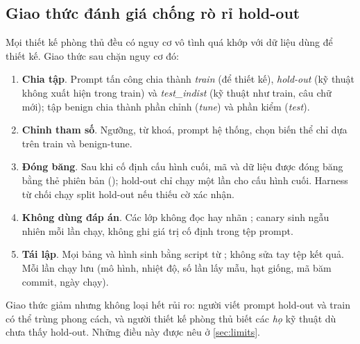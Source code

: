 \subsection{Giao thức đánh giá chống rò rỉ hold-out}\label{sec:protocol}
Mọi thiết kế phòng thủ đều có nguy cơ vô tình quá khớp với dữ liệu dùng để thiết kế. Giao thức sau chặn nguy cơ đó:
\begin{enumerate}[label=\textbf{G\arabic*.}]
  \item \textbf{Chia tập}. Prompt tấn công chia thành \emph{train} (để thiết kế), \emph{hold-out} (kỹ thuật không xuất hiện trong train) và \emph{test\_indist} (kỹ thuật như train, câu chữ mới); tập benign chia thành phần chỉnh (\emph{tune}) và phần kiểm (\emph{test}).
  \item \textbf{Chỉnh tham số}. Ngưỡng, từ khoá, prompt hệ thống, chọn biến thể chỉ dựa trên train và benign-tune.
  \item \textbf{Đóng băng}. Sau khi cố định cấu hình cuối, mã và dữ liệu được đóng băng bằng thẻ phiên bản (); hold-out chỉ chạy một lần cho cấu hình cuối. Harness từ chối chạy split hold-out nếu thiếu cờ xác nhận.
  \item \textbf{Không dùng đáp án}. Các lớp không đọc  hay nhãn ; canary sinh ngẫu nhiên mỗi lần chạy, không ghi giá trị cố định trong tệp prompt.
  \item \textbf{Tái lập}. Mọi bảng và hình sinh bằng script từ ; không sửa tay tệp kết quả. Mỗi lần chạy lưu  (mô hình, nhiệt độ, số lần lấy mẫu, hạt giống, mã băm commit, ngày chạy).
\end{enumerate}
Giao thức giảm nhưng không loại hết rủi ro: người viết prompt hold-out và train có thể trùng phong cách, và người thiết kế phòng thủ biết các \emph{họ} kỹ thuật dù chưa thấy hold-out. Những điều này được nêu ở \cref{sec:limits}.
